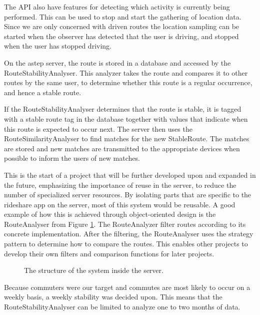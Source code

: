 The API also have features for detecting which activity is currently being performed.
This can be used to stop and start the gathering of location data.
Since we are only concerned with driven routes the location sampling can be started when the observer has detected that the user is driving, and stopped when the user has stopped driving.

On the \gls{astep} server, the route is stored in a database and accessed by the RouteStabilityAnalyser.
This analyzer takes the route and compares it to other routes by the same user, to determine whether this route is a regular occurrence, and hence a stable route.

If the RouteStabilityAnalyser determines that the route is stable, it is tagged with a stable route tag in the database together with values that indicate when this route is expected to occur next.
The server then uses the RouteSimilarityAnalyser to find matches for the new StableRoute.
The matches are stored and new matches are transmitted to the appropriate devices when possible to inform the users of new matches.

%	

This is the start of a project that will be further developed upon and expanded in the future, emphasizing the importance of reuse in the server, to reduce the number of specialized server resources.
By isolating parts that are specific to the rideshare app on the server, most of this system would be reusable.
A good example of how this is achieved through object-oriented design is the RouteAnalyser from Figure \ref{fig:classDiagramSprint1Server}.
The RouteAnalyzer filter routes according to its concrete implementation.
After the filtering, the RouteAnalyser uses the strategy pattern to determine how to compare the routes.
This enables other projects to develop their own filters and comparison functions for later projects.

\begin{figure}[h!]
	\centering
	
	\caption{The structure of the system inside the server.}
	\label{fig:classDiagramSprint1Server}
\end{figure}

Because commuters were our target and commutes are most likely to occur on a weekly basis, a weekly stability was decided upon.
This means that the RouteStabilityAnalyser can be limited to analyze one to two months of data.